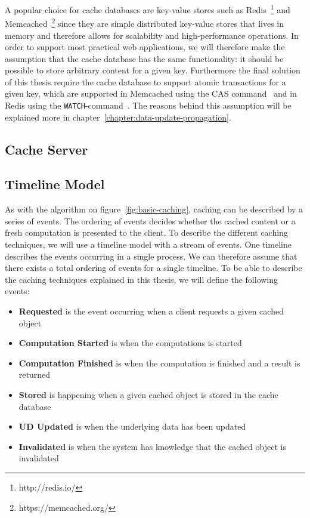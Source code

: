 A popular choice for cache databases are key-value stores such as Redis~\footnote{http://redis.io/} and Memcached~\footnote{https://memcached.org/} since they are simple distributed key-value stores that lives in memory and therefore allows for scalability and high-performance operations. In order to support most practical web applications, we will therefore make the assumption that the cache database has the same functionality: it should be possible to store arbitrary content for a given key. Furthermore the final solution of this thesis require the cache database to support atomic transactions for a given key, which are supported in Memcached using the CAS command~\cite{docs:memcached-protocol} and in Redis using the \verb$WATCH$-command~\cite{docs:redis-transactions}. The reasons behind this assumption will be explained more in chapter~\ref{chapter:data-update-propagation}.


\subsection{Cache Server}
\label{subsec:cache-server}




\subsection{Timeline Model}
\label{subsec:timeline_model}

As with the algorithm on figure~\ref{fig:basic-caching}, caching can be described by a series of events. The ordering of events decides whether the cached content or a fresh computation is presented to the client. To describe the different caching techniques, we will use a timeline model with a stream of events. One timeline describes the events occurring in a single process. We can therefore assume that there exists a total ordering of events for a single timeline. To be able to describe the caching techniques explained in this thesis, we will define the following events:

\begin{itemize}
  \item \textbf{Requested} is the event occurring when a client requests a given cached object
  \item \textbf{Computation Started} is when the computations is started
  \item \textbf{Computation Finished} is when the computation is finished and a result is returned
  \item \textbf{Stored} is happening when a given cached object is stored in the cache database
  \item \textbf{UD Updated} is when the underlying data has been updated
  \item \textbf{Invalidated} is when the system has knowledge that the cached object is invalidated
\end{itemize}

